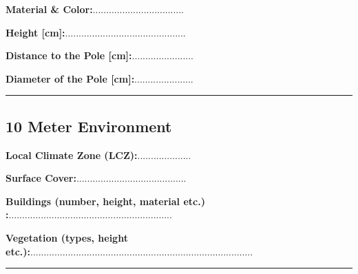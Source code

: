 \vspace{-8mm}
\begin{multicols}{2}
\textbf{Material \& Color:}..................................\hfill \newline

\vspace{-3mm}
\textbf{Height [cm]:}.............................................\hfill \newline
\columnbreak

\textbf{Distance to the Pole [cm]:}.......................\hfill \newline

\vspace{-3mm}
\textbf{Diameter of the Pole [cm]:}......................\hfill \newline
\end{multicols}

\vspace{-10mm}
\rule{\linewidth}{0.1mm}

\vspace{-5mm}
\subsection*{10 Meter Environment}

\begin{multicols}{2}
\textbf{Local Climate Zone (LCZ):}....................\hfill
\columnbreak

\textbf{Surface Cover:}.........................................\hfill\newline

\end{multicols}

\vspace{-7mm}
\textbf{Buildings (number, height, material etc.) :}.............................................................\hfill \newline

\vspace{-3mm}
\textbf{Vegetation (types, height etc.):}...................................................................................\hfill \newline 

\vspace{-5mm}
\rule{\linewidth}{0.1mm}

